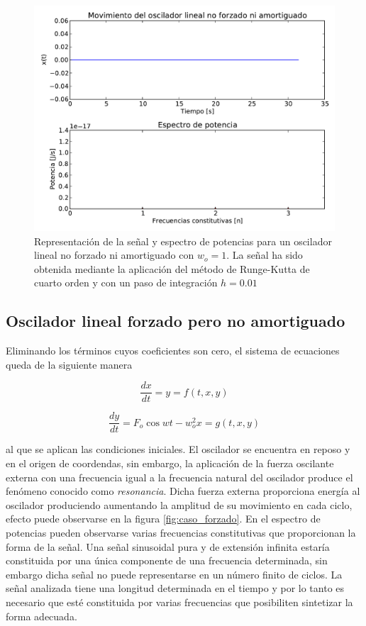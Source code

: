 \documentclass[11pt]{article}
\begin{document}
\begin{figure}
\centering
\includegraphics[width=0.75\linewidth]{caso_lineal.pdf}
\caption{Representación de la señal y espectro de potencias para un oscilador lineal no forzado ni amortiguado con $w_o = 1$. La señal ha sido obtenida mediante la aplicación del método de Runge-Kutta de cuarto orden y con un paso de integración $h = 0.01$}
\label{fig:caso_lineal}
\end{figure}

\subsection{Oscilador lineal forzado pero no amortiguado}
Eliminando los términos cuyos coeficientes son cero, el sistema de ecuaciones queda de la siguiente manera

\begin{equation}
	\frac{dx}{dt} = y = f(t, x, y)
\end{equation}

\begin{equation}
	\frac{dy}{dt} = F_o\cos{wt} - w_o^2 x = g(t, x, y) 	
\end{equation}

al que se aplican las condiciones iniciales. El oscilador se encuentra en reposo y en el origen de coordendas, sin embargo, la aplicación de la fuerza oscilante externa con una frecuencia igual a la frecuencia natural del oscilador produce el fenómeno conocido como \textit{resonancia}. Dicha fuerza externa proporciona energía al oscilador produciendo aumentando la amplitud de su movimiento en cada ciclo, efecto puede observarse en la figura \ref{fig:caso_forzado}. En el espectro de potencias pueden observarse varias frecuencias constitutivas que proporcionan la forma de la señal. Una señal sinusoidal pura y de extensión infinita estaría constituida por una única componente de una frecuencia determinada, sin embargo dicha señal no puede representarse en un número finito de ciclos. La señal analizada tiene una longitud determinada en el tiempo y por lo tanto es necesario que esté constituida por varias frecuencias que posibiliten sintetizar la forma adecuada.
\end{document}
